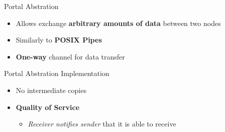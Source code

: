 		\begin{frame}[fragile]{Portal Abstration}
			\begin{itemize}
				\item Allows exchange \textbf{arbitrary amounts of data} between two nodes
				\item Similarly to \textbf{POSIX Pipes}
				\item \textbf{One-way} channel for data transfer
			\end{itemize}


		\end{frame}

		\begin{frame}[fragile]{Portal Abstration Implementation}
			\begin{itemize}
				\item No intermediate copies
				\item \textbf{Quality of Service}
				\begin{itemize}
					\item \textit{Receiver notifies sender} that it is able to receive
				\end{itemize}
			\end{itemize}


		\end{frame}

